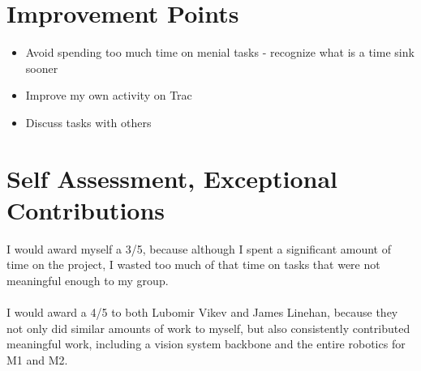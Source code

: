\documentclass[a4paper,12pt]{article}
\begin{document}
\section{Improvement Points}

\begin{itemize}
\item Avoid spending too much time on menial tasks - recognize what is a time sink sooner
\item Improve my own activity on Trac
\item Discuss tasks with others
\end{itemize}


\section{Self Assessment, Exceptional Contributions}

I would award myself a 3/5, because although I spent a significant amount of time on the project, I wasted too much of that time on tasks that were not meaningful enough to my group.\\
\\
I would award a 4/5 to both Lubomir Vikev and James Linehan, because they not only did similar amounts of work to myself, but also consistently contributed meaningful work, including a vision system backbone and the entire robotics for M1 and M2.


\end{document}
